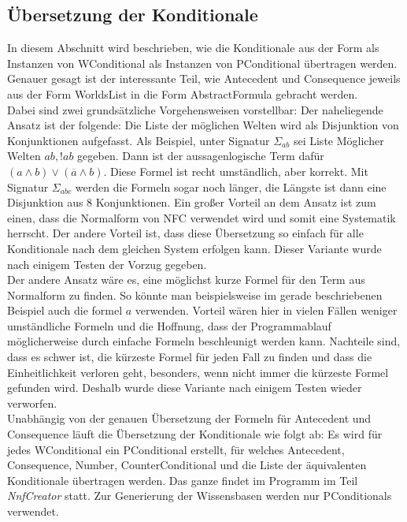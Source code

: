 \documentclass[12pt,a4paper]{article}
\begin{document}
\subsection{Übersetzung der Konditionale}
\label{sec:übersetzung}
In diesem Abschnitt wird beschrieben, wie die Konditionale aus der Form als Instanzen von WConditional als Instanzen von PConditional übertragen werden. Genauer gesagt ist der interessante Teil, wie Antecedent und Consequence jeweils aus der Form WorldsList in die Form AbstractFormula gebracht werden. \\
Dabei sind zwei grundsätzliche Vorgehensweisen vorstellbar: Der naheliegende Ansatz ist der folgende: Die Liste der möglichen Welten wird als Disjunktion von Konjunktionen aufgefasst. Als Beispiel, unter Signatur $\Sigma_{ab}$ sei Liste Möglicher Welten $ab, !ab$ gegeben. Dann ist der aussagenlogische Term dafür $(a \wedge b) \vee (\overline{a}\wedge b)$. Diese Formel ist recht umständlich, aber korrekt. Mit Signatur $\Sigma_{abc}$  werden die Formeln sogar noch länger, die Längste ist dann eine Disjunktion aus 8 Konjunktionen. Ein großer Vorteil an dem Ansatz ist zum einen, dass die Normalform von NFC verwendet wird und somit eine Systematik herrscht. Der andere Vorteil ist, dass diese Übersetzung so einfach für alle Konditionale nach dem gleichen System erfolgen kann. Dieser Variante wurde nach einigem Testen der Vorzug gegeben.\\
Der andere Ansatz wäre es, eine möglichst kurze Formel für den Term aus Normalform zu finden. So könnte man beispielsweise im gerade beschriebenen Beispiel auch die formel $a$ verwenden. Vorteil wären hier in vielen Fällen weniger umständliche Formeln und die Hoffnung, dass der Programmablauf möglicherweise durch einfache Formeln beschleunigt werden kann. Nachteile sind, dass es schwer ist, die kürzeste Formel für jeden Fall zu finden und dass die Einheitlichkeit verloren geht, besonders, wenn nicht immer die kürzeste Formel gefunden wird. Deshalb wurde diese Variante nach einigem Testen wieder verworfen. \\
Unabhängig von der genauen Übersetzung der Formeln für Antecedent und Consequence läuft die Übersetzung der Konditionale wie folgt ab: Es wird für jedes WConditional ein PConditional erstellt, für welches Antecedent, Consequence, Number, CounterConditional und die Liste der äquivalenten Konditionale übertragen werden. Das ganze findet im Programm im Teil \textit{NnfCreator} statt. Zur Generierung der Wissensbasen werden nur PConditionals verwendet. \\
\end{document}
